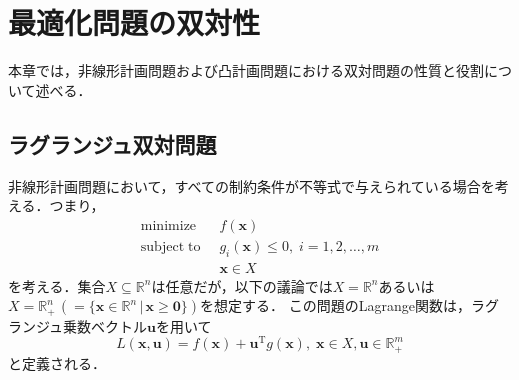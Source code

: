 \documentclass{jsreport}
\begin{document}
\chapter{最適化問題の双対性}
本章では，非線形計画問題および凸計画問題における双対問題の性質と役割について述べる．
\section{ラグランジュ双対問題}
非線形計画問題において，すべての制約条件が不等式で与えられている場合を考える．つまり，
\begin{align}\label{eq:opt_nonl_f_true}
  \mathrm{minimize} \; \; &f(\bm{x}) \nonumber\\
  \mathrm{subject \; to} \; \; &g_i(\bm{x}) \leq 0, \; i = 1, 2, \ldots, m  \\
  &\bm{x} \in X \nonumber
\end{align}
を考える．集合$X \subseteq \mathbb{R}^n$は任意だが，以下の議論では$X = \mathbb{R}^n$あるいは$X = \mathbb{R}_{+}^n \, (= \{\bm{x} \in \mathbb{R}^n \, | \, \bm{x} \geq \bm{0}\})$を想定する．
この問題のLagrange関数は，ラグランジュ乗数ベクトル$\bm{u}$を用いて
\begin{equation}\label{eq:lag}
  L(\bm{x}, \bm{u}) = f(\bm{x}) + \bm{u}^{\mathrm{T}}g(\bm{x}), \; \bm{x} \in X, \bm{u} \in \mathbb{R}_{+}^m
\end{equation}
と定義される．
\end{document}
